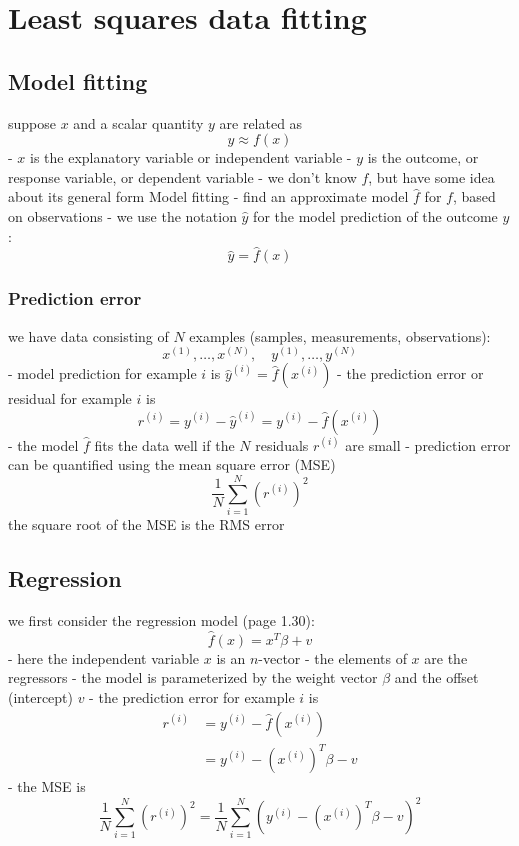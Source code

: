 \chapter{Least squares data fitting}

\section{Model fitting}


suppose $ x $ and a scalar quantity $ y $ are related as
$$
y \approx f(x)
$$
- $ x $ is the explanatory variable or independent variable
- $ y $ is the outcome, or response variable, or dependent variable
- we don't know $ f $, but have some idea about its general form
Model fitting
- find an approximate model $ \hat{f} $ for $ f $, based on observations
- we use the notation $ \hat{y} $ for the model prediction of the outcome $ y $ :
$$
\hat{y}=\hat{f}(x)
$$


\subsection{Prediction error}

we have data consisting of $ N $ examples (samples, measurements, observations):
$$
x^{(1)}, \ldots, x^{(N)}, \quad y^{(1)}, \ldots, y^{(N)}
$$
- model prediction for example $ i $ is $ \hat{y}^{(i)}=\hat{f}\left(x^{(i)}\right) $
- the prediction error or residual for example $ i $ is
$$
r^{(i)}=y^{(i)}-\hat{y}^{(i)}=y^{(i)}-\hat{f}\left(x^{(i)}\right)
$$
- the model $ \hat{f} $ fits the data well if the $ N $ residuals $ r^{(i)} $ are small
- prediction error can be quantified using the mean square error (MSE)
$$
\frac{1}{N} \sum_{i=1}^{N}\left(r^{(i)}\right)^{2}
$$
the square root of the MSE is the RMS error

\section{Regression}

we first consider the regression model (page 1.30):
$$
\hat{f}(x)=x^{T} \beta+v
$$
- here the independent variable $ x $ is an $ n $-vector
- the elements of $ x $ are the regressors
- the model is parameterized by the weight vector $ \beta $ and the offset (intercept) $ v $
- the prediction error for example $ i $ is
$$
\begin{aligned}
r^{(i)} &=y^{(i)}-\hat{f}\left(x^{(i)}\right) \\
&=y^{(i)}-\left(x^{(i)}\right)^{T} \beta-v
\end{aligned}
$$
- the MSE is
$$
\frac{1}{N} \sum_{i=1}^{N}\left(r^{(i)}\right)^{2}=\frac{1}{N} \sum_{i=1}^{N}\left(y^{(i)}-\left(x^{(i)}\right)^{T} \beta-v\right)^{2}
$$

